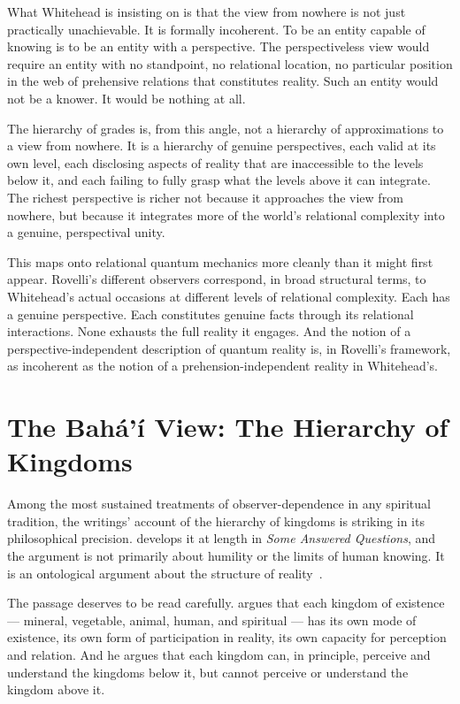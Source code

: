 What Whitehead is insisting on is that the view from nowhere is not just practically unachievable.
It is formally incoherent.
To be an entity capable of knowing is to be an entity with a perspective.
The perspectiveless view would require an entity with no standpoint, no relational location, no particular position in the web of prehensive relations that constitutes reality.
Such an entity would not be a knower.
It would be nothing at all.

The hierarchy of grades is, from this angle, not a hierarchy of approximations to a view from nowhere.
It is a hierarchy of genuine perspectives, each valid at its own level, each disclosing aspects of reality that are inaccessible to the levels below it, and each failing to fully grasp what the levels above it can integrate.
The richest perspective is richer not because it approaches the view from nowhere, but because it integrates more of the world's relational complexity into a genuine, perspectival unity.

This maps onto relational quantum mechanics more cleanly than it might first appear.
Rovelli's different observers correspond, in broad structural terms, to Whitehead's actual occasions at different levels of relational complexity.
Each has a genuine perspective.
Each constitutes genuine facts through its relational interactions.
None exhausts the full reality it engages.
And the notion of a perspective-independent description of quantum reality is, in Rovelli's framework, as incoherent as the notion of a prehension-independent reality in Whitehead's.

\section{The Bahá'í View: The Hierarchy of Kingdoms}
\label{sec:ch9-bahai}

Among the most sustained treatments of observer-dependence in any spiritual tradition, the \bahai writings' account of the hierarchy of kingdoms is striking in its philosophical precision.
\AbdulBaha develops it at length in \emph{Some Answered Questions}, and the argument is not primarily about humility or the limits of human knowing.
It is an ontological argument about the structure of reality~\citep[Part 4]{SAQ}.

The passage deserves to be read carefully.
\AbdulBaha argues that each kingdom of existence --- mineral, vegetable, animal, human, and spiritual --- has its own mode of existence, its own form of participation in reality, its own capacity for perception and relation.
And he argues that each kingdom can, in principle, perceive and understand the kingdoms below it, but cannot perceive or understand the kingdom above it.


